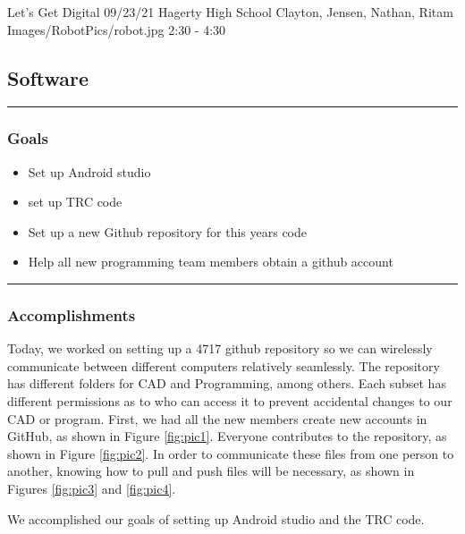 \insertmeeting 
	{Let's Get Digital} 
	{09/23/21}
	{Hagerty High School}
	{Clayton, Jensen, Nathan, Ritam}
	{Images/RobotPics/robot.jpg}
	{2:30 - 4:30}
	
\subsection*{Software}
\noindent\hfil\rule{\textwidth}{.4pt}\hfil
\subsubsection*{Goals}
\begin{itemize}
    \item Set up Android studio
    \item set up TRC code   
    \item Set up a new Github repository for this years code
    \item Help all new programming team members obtain a github account 
\end{itemize} 

\noindent\hfil\rule{\textwidth}{.4pt}\hfil

\subsubsection*{Accomplishments}
Today, we worked on setting up a 4717 github repository so we can wirelessly communicate between different computers relatively seamlessly. The repository has different folders for CAD and Programming, among others. Each subset has different permissions as to who can access it to prevent accidental changes to our CAD or program. First, we had all the new members create new accounts in GitHub, as shown in Figure \ref{fig:pic1}. Everyone contributes to the repository, as shown in Figure \ref{fig:pic2}. In order to communicate these files from one person to another, knowing how to pull and push files will be necessary, as shown in Figures \ref{fig:pic3} and \ref{fig:pic4}. 
 
We accomplished our goals of setting up Android studio and the TRC code.
 

